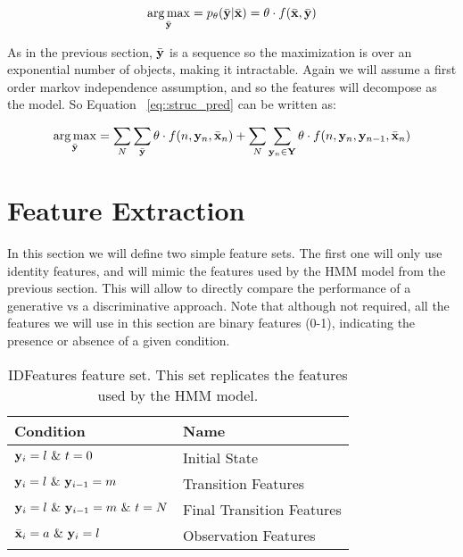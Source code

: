 \begin{equation}
\operatorname*{arg\,max}_{\bar{\mathbf{y}}} = p_{\theta} (\bar{\mathbf{y}} | \bar{\mathbf{x}} ) = \theta \cdot  f(\bar{\mathbf{x}},\bar{\mathbf{y}}) \label{eq::struc_pred} 
\end{equation}

As in the previous section, $\bar{\mathbf{y}}$ is a sequence so the maximization
is over an exponential number of objects, making it intractable. Again
we will assume a first order markov independence assumption, and so the
features will decompose as the model. So Equation
~\ref{eq::struc_pred} can be written as:

\begin{equation}
\operatorname*{arg\,max}_{\bar{\mathbf{y}}} = \sum_N \sum_{\bar{\mathbf{y}}} \theta \cdot
f(n,\mathbf{y}_n,\bar{\mathbf{x}}_n)  + \sum_N \sum_{\mathbf{y}_n \in \mathbf{Y}} \theta \cdot f(n,\mathbf{y}_n,\mathbf{y}_{n-1},\bar{\mathbf{x}}_n)\label{eq::struc_pred_decompose} 
\end{equation}



\section{\label{seq::features} Feature Extraction}

In this section we will define two simple feature sets. The first one
will only use identity features, and will mimic the features used by
the HMM model from the previous section. This will allow to directly
compare the performance of a generative vs a discriminative
approach. Note that although not required, all the features we will use
in this section are binary features (0-1), indicating the presence or
absence of a given condition. 

\begin{table}
\begin{center}
\begin{tabular}{|l|l|}
\hline
Condition & Name\\
\hline
$\mathbf{y}_i = l \text{  } \& \text{  } t =0 $& Initial State \\
\hline
$\mathbf{y}_i = l \text{  } \& \text{  } \mathbf{y}_{i-1} = m$& Transition Features \\
\hline
$\mathbf{y}_i = l \text{  } \& \text{  } \mathbf{y}_{i-1} = m \text{  }\& \text{  } t = N$& Final Transition Features \\
\hline
$\bar{\mathbf{x}}_i = a \text{  } \& \text{  } \mathbf{y}_i = l$& Observation Features \\
\hline
\end{tabular}
\caption{\label{id-features} IDFeatures feature set. This set
  replicates the features used by the HMM model.}
\end{center}
\end{table}

